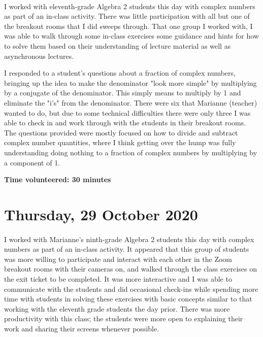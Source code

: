\documentclass{article}
\begin{document}
\paragraph{}I worked with eleventh-grade Algebra 2 students this day with complex numbers as part of an in-class activity. There was little participation with all but one of the breakout rooms that I did sweeps through. That one group I worked with, I was able to walk through some in-class exercises some guidance and hints for how to solve them based on their understanding of lecture material as well as asynchronous lectures. 

I responded to a student's questions about a fraction of complex numbers, bringing up the idea to make the denominator "look more simple" by multiplying by a conjugate of the denominator. This simply means to multiply by 1 and eliminate the "i's" from the denominator. There were six that Marianne (teacher) wanted to do, but due to some technical difficulties there were only three I was able to check in and work through with the students in their breakout rooms. The questions provided were mostly focused on how to divide and subtract complex number quantities, where I think getting over the hump was fully understanding doing nothing to a fraction of complex numbers by multiplying by a component of 1. 

\textbf{Time volunteered: 30 minutes}

\section{Thursday, 29 October 2020}

\paragraph{}I worked with Marianne's ninth-grade Algebra 2 students this day with complex numbers as part of an in-class activity. It appeared that this group of students was more willing to participate and interact with each other in the Zoom breakout rooms with their cameras on, and walked through the class exercises on the exit ticket to be completed. It was more interactive and I was able to communicate with the students and did occasional check-ins while spending more time with students in solving these exercises with basic concepts similar to that working with the eleventh grade students the day prior. There was more productivity with this class; the students were more open to explaining their work and sharing their screens whenever possible. 
\end{document}
